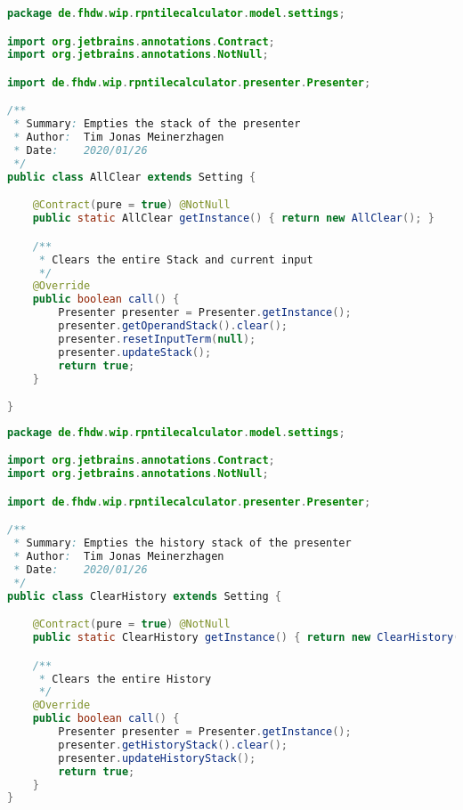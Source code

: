 \begin{lstlisting}[caption=AllClear (Meinerzhagen),label=list:AllClear,language=Java]
package de.fhdw.wip.rpntilecalculator.model.settings;

import org.jetbrains.annotations.Contract;
import org.jetbrains.annotations.NotNull;

import de.fhdw.wip.rpntilecalculator.presenter.Presenter;

/**
 * Summary: Empties the stack of the presenter
 * Author:  Tim Jonas Meinerzhagen
 * Date:    2020/01/26
 */
public class AllClear extends Setting {

    @Contract(pure = true) @NotNull
    public static AllClear getInstance() { return new AllClear(); }

    /**
     * Clears the entire Stack and current input
     */
    @Override
    public boolean call() {
        Presenter presenter = Presenter.getInstance();
        presenter.getOperandStack().clear();
        presenter.resetInputTerm(null);
        presenter.updateStack();
        return true;
    }

}
\end{lstlisting}    

\begin{lstlisting}[caption=ClearHistory (Meinerzhagen),label=list:ClearHistory,language=Java]
package de.fhdw.wip.rpntilecalculator.model.settings;

import org.jetbrains.annotations.Contract;
import org.jetbrains.annotations.NotNull;

import de.fhdw.wip.rpntilecalculator.presenter.Presenter;

/**
 * Summary: Empties the history stack of the presenter
 * Author:  Tim Jonas Meinerzhagen
 * Date:    2020/01/26
 */
public class ClearHistory extends Setting {

    @Contract(pure = true) @NotNull
    public static ClearHistory getInstance() { return new ClearHistory(); }

    /**
     * Clears the entire History
     */
    @Override
    public boolean call() {
        Presenter presenter = Presenter.getInstance();
        presenter.getHistoryStack().clear();
        presenter.updateHistoryStack();
        return true;
    }
}
\end{lstlisting}    

